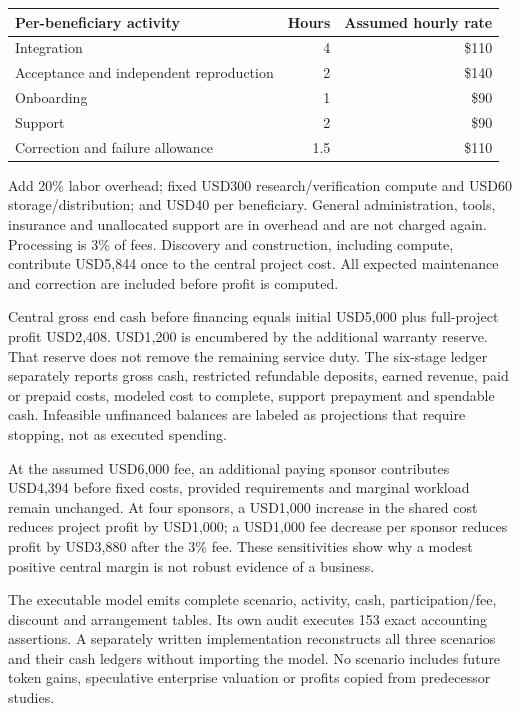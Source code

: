 \documentclass[11pt,a4paper]{article}
\begin{document}
\begin{longtable}[]{@{}lrr@{}}
\toprule\noalign{}
Per-beneficiary activity & Hours & Assumed hourly rate \\
\midrule\noalign{}
\endhead
\bottomrule\noalign{}
\endlastfoot
Integration & 4 & \$110 \\
Acceptance and independent reproduction & 2 & \$140 \\
Onboarding & 1 & \$90 \\
Support & 2 & \$90 \\
Correction and failure allowance & 1.5 & \$110 \\
\end{longtable}

Add 20\% labor overhead; fixed USD300 research/verification compute and
USD60 storage/distribution; and USD40 per beneficiary. General
administration, tools, insurance and unallocated support are in overhead
and are not charged again. Processing is 3\% of fees. Discovery and
construction, including compute, contribute USD5,844 once to the central
project cost. All expected maintenance and correction are included
before profit is computed.

Central gross end cash before financing equals initial USD5,000 plus
full-project profit USD2,408. USD1,200 is encumbered by the additional
warranty reserve. That reserve does not remove the remaining service
duty. The six-stage ledger separately reports gross cash, restricted
refundable deposits, earned revenue, paid or prepaid costs, modeled cost
to complete, support prepayment and spendable cash. Infeasible
unfinanced balances are labeled as projections that require stopping,
not as executed spending.

At the assumed USD6,000 fee, an additional paying sponsor contributes
USD4,394 before fixed costs, provided requirements and marginal workload
remain unchanged. At four sponsors, a USD1,000 increase in the shared
cost reduces project profit by USD1,000; a USD1,000 fee decrease per
sponsor reduces profit by USD3,880 after the 3\% fee. These
sensitivities show why a modest positive central margin is not robust
evidence of a business.

The executable model emits complete scenario, activity, cash,
participation/fee, discount and arrangement tables. Its own audit
executes 153 exact accounting assertions. A separately written
implementation reconstructs all three scenarios and their cash ledgers
without importing the model. No scenario includes future token gains,
speculative enterprise valuation or profits copied from predecessor
studies.
\end{document}
